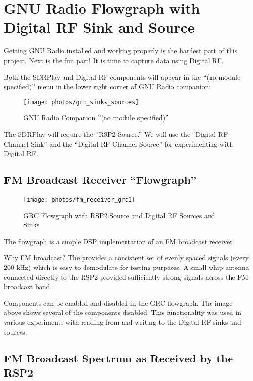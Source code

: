 \chapter{GNU Radio Flowgraph with Digital RF Sink and Source}

Getting GNU Radio installed and working properly is the hardest part of this project.
Next is the fun part!  It is time to capture data using Digital RF.

Both the SDRPlay and Digital RF components will appear in the ``(no module specified)'' menu in the lower right corner of GNU Radio companion:

\begin{figure}[H]
	\centering
	\texttt{[image: photos/grc\_sinks\_sources]}
	\centering\bfseries
	\caption{GNU Radio Companion ''(no module specified)''}
\end{figure}

The SDRPlay will require the ``RSP2 Source.''  We will use the ``Digital RF Channel Sink'' and the ``Digital RF Channel Source'' for experimenting with Digital RF.

\section{FM Broadcast Receiver ``Flowgraph''}

\begin{figure}[H]
	\centering
	\texttt{[image: photos/fm\_receiver\_grc1]}
	\centering\bfseries
	\caption{GRC Flowgraph with RSP2 Source and Digital RF Sources and Sinks}
\end{figure}

The flowgraph is a simple DSP implementation of an FM broadcast receiver.

Why FM broadcast?  The provides a consistent set of evenly spaced signals (every 200 kHz) which is easy to demodulate for testing purposes.  A small whip antenna connected directly to the RSP2 provided sufficiently strong signals across the FM broadcast band.

Components can be enabled and disabled in the GRC flowgraph.  The image above shows several of the components disabled.  This functionality was used in various experiments with reading from and writing to the Digital RF sinks and sources.

\section{FM Broadcast Spectrum as Received by the RSP2}

